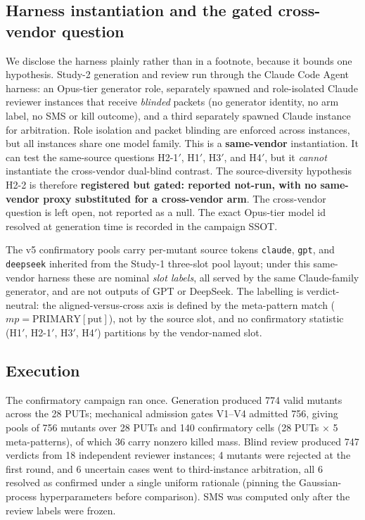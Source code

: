 \documentclass[manuscript,screen,review]{acmart}
\begin{document}
\subsection{Harness instantiation and the gated cross-vendor
question}\label{study2-harness}

We disclose the harness plainly rather than in a footnote, because it
bounds one hypothesis. Study-2 generation and review run through the
Claude Code Agent harness: an Opus-tier generator role, separately
spawned and role-isolated Claude reviewer instances that receive
\emph{blinded} packets (no generator identity, no arm label, no SMS or
kill outcome), and a third separately spawned Claude instance for
arbitration. Role isolation and packet blinding are enforced across
instances, but all instances share one model family. This is a
\textbf{same-vendor} instantiation. It can test the same-source
questions H2-1\('\), H1\('\), H3\('\), and H4\('\), but it
\emph{cannot} instantiate the cross-vendor dual-blind contrast. The
source-diversity hypothesis H2-2 is therefore \textbf{registered but
gated: reported not-run, with no same-vendor proxy substituted for a
cross-vendor arm}. The cross-vendor question is left open, not reported
as a null. The exact Opus-tier model id resolved at generation time is
recorded in the campaign SSOT.

The v5 confirmatory pools carry per-mutant source tokens \texttt{claude},
\texttt{gpt}, and \texttt{deepseek} inherited from the Study-1 three-slot
pool layout; under this same-vendor harness these are nominal \emph{slot
labels}, all served by the same Claude-family generator, and are not
outputs of GPT or DeepSeek. The labelling is verdict-neutral: the
aligned-versus-cross axis is defined by the meta-pattern match
(\(\mathit{mp} = \mathrm{PRIMARY}[\mathrm{put}]\)), not by the source
slot, and no confirmatory statistic (H1\('\), H2-1\('\), H3\('\),
H4\('\)) partitions by the vendor-named slot.

\subsection{Execution}\label{study2-execution}

The confirmatory campaign ran once. Generation produced 774 valid
mutants across the 28 PUTs; mechanical admission gates V1--V4 admitted
756, giving pools of 756 mutants over 28 PUTs and 140 confirmatory cells
(28 PUTs \(\times\) 5 meta-patterns), of which 36 carry nonzero killed
mass. Blind review produced 747 verdicts from 18 independent reviewer
instances; 4 mutants were rejected at the first round, and 6 uncertain
cases went to third-instance arbitration, all 6 resolved as confirmed
under a single uniform rationale (pinning the Gaussian-process
hyperparameters before comparison). SMS was computed only after the
review labels were frozen.
\end{document}
